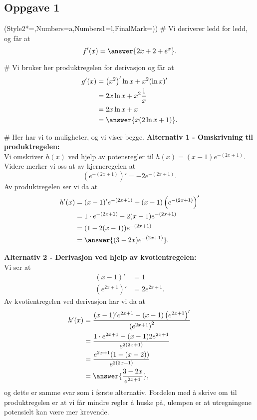\subsection*{Oppgave 1}
\begin{easylist}[enumerate]
\ListProperties(Style2*=,Numbers=a,Numbers1=l,FinalMark={)})
# Vi deriverer ledd for ledd, og får at
\begin{equation*}
	f'(x) = \answer{2x + 2 + e^x}.
\end{equation*}

# Vi bruker her produktregelen for derivasjon og får at
\begin{align*}
	g'(x) &= \left(x^2\right)'\ln x + x^2(\ln x)' 	\\
	&= 2x \ln x + x^2 \frac{1}{x} \\
	&= 2x \ln x + x \\
	&= \answer{x(2\ln x + 1)}.
\end{align*}


# Her har vi to muligheter, og vi viser begge.
\textbf{Alternativ 1 - Omskrivning til produktregelen:} \\
Vi omskriver $ h(x) $ ved hjelp av potensregler til $h(x) = (x-1)e^{-(2x+1)}$.
Videre merker vi oss at av kjerneregelen at
\begin{equation*}
	\left(e^{-(2x+1)}\right)'=-2e^{-(2x+1)}.
\end{equation*}
Av produktregelen ser vi da at
\begin{align*}
h'(x) &= (x-1)'e^{-(2x+1)}+(x-1)\left(e^{-(2x+1)}\right)'  \\
&= 1\cdot e^{-(2x+1)} - 2(x-1)e^{-(2x+1)} \\
&= (1-2(x-1))e^{-(2x+1)} \\
&= \answer{(3-2x)e^{-(2x+1)}}.
\end{align*}

\textbf{Alternativ 2 - Derivasjon ved hjelp av kvotientregelen:}\\
Vi ser at
\begin{align*}
	(x-1)' &= 1\\
	\left(e^{2x+1}\right)' &= 2e^{2x+1}. \tag{kjerneregelen}
\end{align*}
Av kvotientregelen ved derivasjon har vi da at
\begin{align*}
	h'(x) &= \frac{(x-1)'e^{2x+1}-(x-1)\left(e^{2x+1}\right)'}{\left(e^{2x+1}\right)^2} \\
	&= \frac{1\cdot e^{2x+1} - (x-1)2e^{2x+1}}{e^{2(2x+1)}
	} \\
	&= \frac{e^{2x+1}(1-(x-2))}{e^{2(2x+1)}}\\
	&= \answer{\frac{3-2x}{e^{2x+1}}},
\end{align*}
og dette er samme svar som i første alternativ.
Fordelen med å skrive om til produktregelen er at vi får mindre regler å huske på, ulempen er at utregningene potensielt kan være mer krevende.

\end{easylist}



